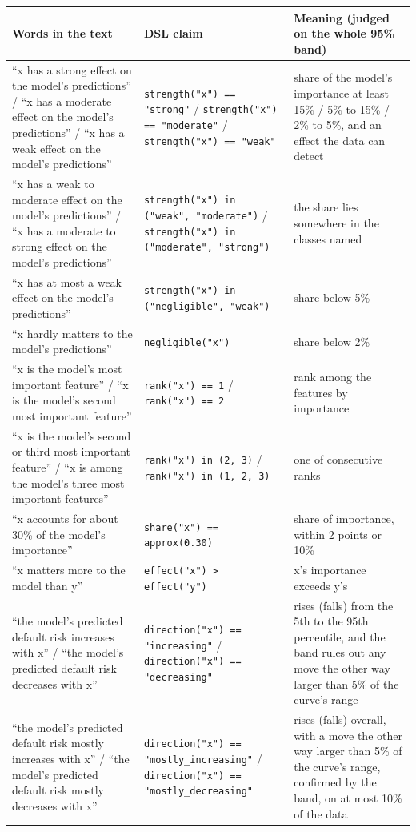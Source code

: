 \begin{tabular}{p{4.6cm}p{4.6cm}p{5.6cm}}
\toprule
\textbf{Words in the text} & \textbf{DSL claim} & \textbf{Meaning (judged on the whole 95\% band)} \\
\midrule
“x has a strong effect on the model's predictions” / “x has a moderate effect on the model's predictions” / “x has a weak effect on the model's predictions” & \texttt{strength("x") == "strong"} / \texttt{strength("x") == "moderate"} / \texttt{strength("x") == "weak"} & share of the model's importance at least 15\% / 5\% to 15\% / 2\% to 5\%, and an effect the data can detect \\
“x has a weak to moderate effect on the model's predictions” / “x has a moderate to strong effect on the model's predictions” & \texttt{strength("x") in ("weak", "moderate")} / \texttt{strength("x") in ("moderate", "strong")} & the share lies somewhere in the classes named \\
“x has at most a weak effect on the model's predictions” & \texttt{strength("x") in ("negligible", "weak")} & share below 5\% \\
“x hardly matters to the model's predictions” & \texttt{negligible("x")} & share below 2\% \\
“x is the model's most important feature” / “x is the model's second most important feature” & \texttt{rank("x") == 1} / \texttt{rank("x") == 2} & rank among the features by importance \\
“x is the model's second or third most important feature” / “x is among the model's three most important features” & \texttt{rank("x") in (2, 3)} / \texttt{rank("x") in (1, 2, 3)} & one of consecutive ranks \\
“x accounts for about 30\% of the model's importance” & \texttt{share("x") == approx(0.30)} & share of importance, within 2 points or 10\% \\
“x matters more to the model than y” & \texttt{effect("x") > effect("y")} & x's importance exceeds y's \\
“the model's predicted default risk increases with x” / “the model's predicted default risk decreases with x” & \texttt{direction("x") == "increasing"} / \texttt{direction("x") == "decreasing"} & rises (falls) from the 5th to the 95th percentile, and the band rules out any move the other way larger than 5\% of the curve's range \\
“the model's predicted default risk mostly increases with x” / “the model's predicted default risk mostly decreases with x” & \texttt{direction("x") == "mostly\_increasing"} / \texttt{direction("x") == "mostly\_decreasing"} & rises (falls) overall, with a move the other way larger than 5\% of the curve's range, confirmed by the band, on at most 10\% of the data \\

\end{tabular}
